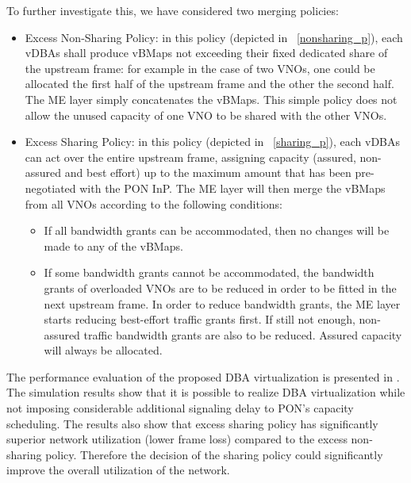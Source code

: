 To further investigate this, we have considered two merging policies:
\begin{itemize}
    \item Excess Non-Sharing Policy: in this policy (depicted in \figureautorefname~\ref{nonsharing_p}), each \acp{vDBA} shall produce \acp{vBMap} not exceeding their fixed dedicated share of the upstream frame: for example in the case of two \acp{VNO}, one could be allocated the first half of the upstream frame and the other the second half. The \ac{ME} layer simply concatenates the \acp{vBMap}. This simple policy does not allow the unused capacity of one \ac{VNO} to be shared with the other \acp{VNO}.
    
    \item Excess Sharing Policy: in this policy (depicted in \figureautorefname~\ref{sharing_p}), each \acp{vDBA} can act over the entire upstream frame, assigning capacity (assured, non-assured and best effort) up to the maximum amount that has been pre-negotiated with the \ac{PON} \ac{InP}. The \ac{ME} layer will then merge the \acp{vBMap} from all \acp{VNO} according to the following conditions:
        \begin{itemize}
            \item If all bandwidth grants can be accommodated, then no changes will be made to any of the \acp{vBMap}.
            
            \item If some bandwidth grants cannot be accommodated, the bandwidth grants of overloaded \acp{VNO} are to be reduced in order to be fitted in the next upstream frame. In order to reduce bandwidth grants, the \ac{ME} layer starts reducing best-effort traffic grants first. If still not enough, non-assured traffic bandwidth grants are also to be reduced. Assured capacity will always be allocated.
        \end{itemize}
\end{itemize}

The performance evaluation of the proposed \ac{DBA} virtualization is presented in \cite{Elrasad:17}. The simulation results show that it is possible to realize \ac{DBA} virtualization while not imposing considerable additional signaling delay to \ac{PON}'s capacity scheduling. The results also show that excess sharing policy has significantly superior network utilization (lower frame loss) compared to the excess non-sharing policy. Therefore the decision of the sharing policy could significantly improve the overall utilization of the network.

